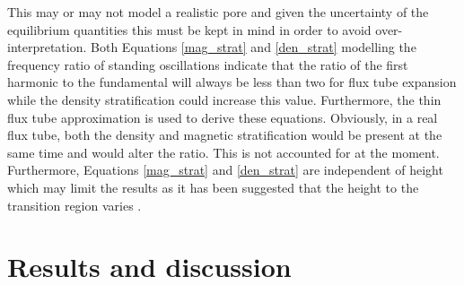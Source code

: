     This may or may not model a realistic pore and given the uncertainty of the equilibrium quantities this must be kept in mind in order to avoid over-interpretation.
    Both Equations \ref{mag_strat} and \ref{den_strat} modelling the frequency ratio of standing oscillations indicate that the ratio of the first harmonic to the fundamental will always be less than two for flux tube expansion while the density stratification could increase this value.
    Furthermore, the thin flux tube approximation is used to derive these equations.
    Obviously, in a real flux tube, both the density and magnetic stratification would be present at the same time and would alter the ratio.
    This is not accounted for at the moment.
    Furthermore, Equations \ref{mag_strat} and \ref{den_strat} are independent of height which may limit the results as it has been suggested that the height to the transition region varies \citep{tian2009solar}.	
    
\section{Results and discussion}
\label{res}

